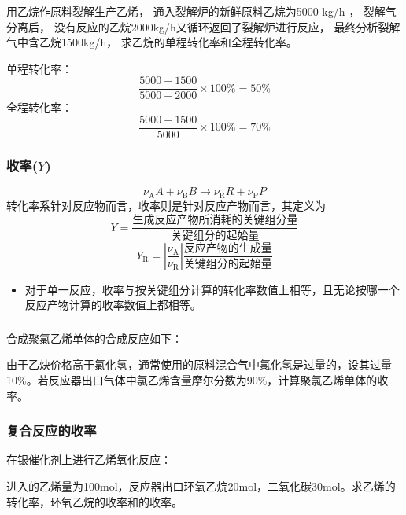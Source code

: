 \documentclass[dvipsnames, svgnames, x11names]{beamer}
\begin{document}
\begin{frame}[t]
    \frametitle{}
    \begin{example}
      用乙烷作原料裂解生产乙烯， 通入裂解炉的新鲜原料乙烷为5000 kg/h ， 裂解气分离后， 没有反应的乙烷2000kg/h又循环返回了裂解炉进行反应， 最终分析裂解气中含乙烷1500kg/h， 求乙烷的单程转化率和全程转化率。
    \end{example}
    \pause
    单程转化率：
    \[
      \frac{5000-1500}{5000+2000} \times 100\% = 50\%
    \]
    全程转化率：
    \[
        \frac{5000-1500}{5000} \times 100\% = 70\%
    \]
\end{frame}


\begin{frame}
    \frametitle{收率($Y$)}
    \[
        {\nu_\mathrm{A}}{A}+{\nu_\mathrm{B}}{B}\to{\nu_\mathrm{R}}{R}+{\nu_\mathrm{P}}{P}
    \]
    转化率系针对反应物而言，收率则是针对反应产物而言，其定义为
    \[
        Y=\frac{\text{生成反应产物所消耗的关键组分量}}{\text{关键组分的起始量}}
    \]
    \[
        Y_\mathrm{R}=\left|\frac{\nu_\mathrm{A}}{\nu_\mathrm{R}}\right|\frac{\text{反应产物的生成量}}{\text{关键组分的起始量}}
    \]
    \begin{itemize}
      \item 对于单一反应，收率与按关键组分计算的转化率数值上相等，且无论按哪一个反应产物计算的收率数值上都相等。
    \end{itemize}
\end{frame}


\begin{frame}[t]
    \frametitle{}
    \begin{example}
      合成聚氯乙烯单体的合成反应如下：

      由于乙炔价格高于氯化氢，通常使用的原料混合气中氯化氢是过量的，设其过量10\%。若反应器出口气体中氯乙烯含量摩尔分数为90\%，计算聚氯乙烯单体的收率。
    \end{example}
\end{frame}


\begin{frame}[t]
    \frametitle{复合反应的收率}
    \begin{example}
        在银催化剂上进行乙烯氧化反应：


        
        进入的乙烯量为100mol，反应器出口环氧乙烷20mol，二氧化碳30mol。求乙烯的转化率，环氧乙烷的收率和的收率。
    \end{example}
\end{frame}
\end{document}
